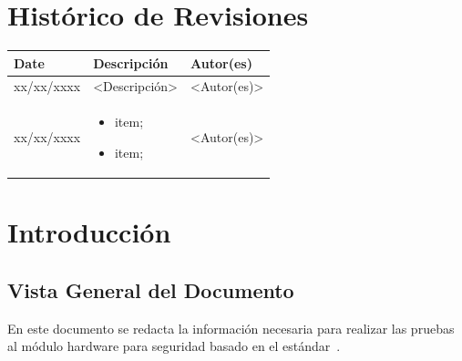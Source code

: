 \documentclass{article}
\begin{document}

\capa
\newpage

\section*{\center Histórico de Revisiones}
  \vspace*{1cm}
  \begin{table}[ht]
    \centering
    \begin{tabular}[pos]{|m{2cm} | m{7.2cm} | m{3.8cm}|} 
      \hline
      \cellcolor[gray]{0.9}
      \textbf{Date} & \cellcolor[gray]{0.9}\textbf{Descripción} & \cellcolor[gray]{0.9}\textbf{Autor(es)}\\ \hline
      \hline
      \small xx/xx/xxxx & \small <Descripción> & \small <Autor(es)> \\ \hline      
      \small xx/xx/xxxx &
      \begin{small}
        \begin{itemize}
          \item item;
          \item item;
        \end{itemize}
      \end{small} & \small <Autor(es)> \\ \hline 
    \end{tabular}
  \end{table}

\newpage

\tableofcontents
\newpage

\section{Introducción}

\subsection{Vista General del Documento}
En este documento se redacta la información necesaria para realizar las pruebas al módulo hardware para seguridad basado en el estándar~\cite{1059-1993-std:1994}.
\end{document}
